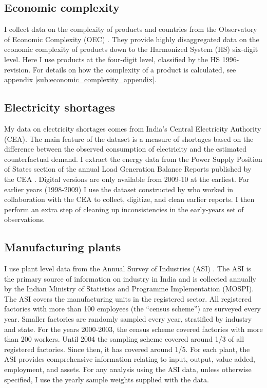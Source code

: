 \documentclass[11pt]{article}
\begin{document}
\subsection{Economic complexity}%
\label{sub:international_trade_data}
I collect data on the complexity of products and countries from the Observatory of Economic Complexity (OEC) \citep{simoes_economic_2011}. They provide highly disaggregated data on the economic complexity of products down to the Harmonized System (HS) six-digit level. Here I use products at the four-digit level, classified by the HS 1996-revision. For details on how the complexity of a product is calculated, see appendix \ref{sub:economic_complexity_appendix}.

\subsection{Electricity shortages}%
\label{sub:energy_data}
My data on electricity shortages comes from India's Central Electricity Authority (CEA). The main feature of the dataset is a measure of shortages based on the difference between the observed consumption of electricity and the estimated counterfactual demand. I extract the energy data from the Power Supply Position of States section of the annual Load Generation Balance Reports published by the CEA \citep{cea_load_2009}. Digital versions are only available from 2009-10 at the earliest. For earlier years (1998-2009) I use the dataset constructed by \cite{allcott_how_2016} who worked in collaboration with the CEA to collect, digitize, and clean earlier reports. I then perform an extra step of cleaning up inconsistencies in the early-years set of observations.

\subsection{Manufacturing plants}%
\label{sub:plant_data}
I use plant level data from the Annual Survey of Industries (ASI) \citep{mospi_annual_2000-1}. The ASI is the primary source of information on industry in India and is collected annually by the Indian Ministry of Statistics and Programme Implementation (MOSPI). The ASI covers the manufacturing units in the registered sector. All registered factories with more than 100 employees (the ``census scheme'') are surveyed every year. Smaller factories are randomly sampled every year, stratified by industry and state. For the years 2000-2003, the census scheme covered factories with more than 200 workers. Until 2004 the sampling scheme covered around 1/3 of all registered factories. Since then, it has covered around 1/5. For each plant, the ASI provides comprehensive information relating to input, output, value added, employment, and assets. For any analysis using the ASI data, unless otherwise specified, I use the yearly sample weights supplied with the data.
\end{document}
